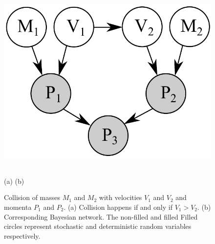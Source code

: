 \documentclass{article}
\begin{document}
\begin{figure}
\begin{center}
\begin{minipage}{\linewidth/6}
\end{minipage}
\hspace{7mm}
\begin{minipage}{\linewidth/2}
                \includegraphics[width=0.80\linewidth]{Figs/little-momentum1.pdf}
\end{minipage}
\vspace{3mm}\\
(a) \hspace{30mm}(b)
\caption{\footnotesize 
Collision of masses $M_1$ and $M_2$ with velocities $V_1$ and $V_2$ and momenta $P_1$ and $P_2$. 
(a) Collision happens if and only if $V_1>V_2$. (b) Corresponding Bayesian network. The non-filled and filled Filled circles represent stochastic and deterministic random variables respectively.} 
\label{fig:mom0}
\vspace{-4mm}
\end{center}
\end{figure}
\end{document}
